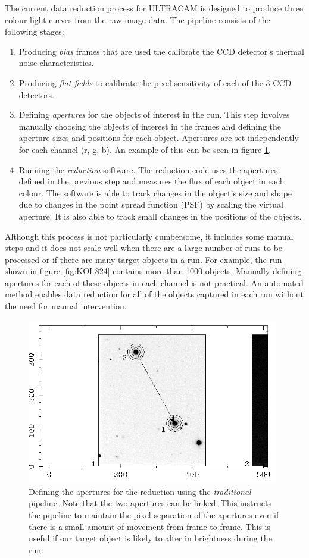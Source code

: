 The current data reduction process for ULTRACAM is designed to produce three colour light curves from the raw image data. The pipeline consists of the following stages:
\begin{enumerate}
	\item Producing \emph{bias} frames that are used the calibrate the CCD detector's thermal noise characteristics. 
	\item Producing \emph{flat-fields} to calibrate the pixel sensitivity of each of the 3 CCD detectors. 
	\item Defining \emph{apertures} for the objects of interest in the run. This step involves manually choosing the objects of interest in the frames and defining the aperture sizes and positions for each object. Apertures are set independently for each channel (r, g, b). An example of this can be seen in figure \ref{fig:settingapertures}.
	\item Running the \emph{reduction} software. The reduction code uses the apertures defined in the previous step and measures the flux of each object in each colour. The software is able to track changes in the object's size and shape due to changes in the point spread function (PSF) by scaling the virtual aperture. It is also able to track small changes in the positions of the objects. 
\end{enumerate} 
Although this process is not particularly cumbersome, it includes some manual steps and it does not scale well when there are a large number of runs to be processed or if there are many target objects in a run. For example, the run shown in figure \ref{fig:KOI-824} contains more than 1000 objects. Manually defining apertures for each of these objects in each channel is not practical. An automated method enables data reduction for all of the objects captured in each run without the need for manual intervention. 

\begin{figure}
\centering
\includegraphics[width=110mm]{images/setaper.png}
\caption{Defining the apertures for the reduction using the \emph{traditional} pipeline. Note that the two apertures can be linked. This instructs the pipeline to maintain the pixel separation of the apertures even if there is a small amount of movement from frame to frame. This is useful if our target object is likely to alter in brightness during the run.}
\label{fig:settingapertures}
\end{figure}

